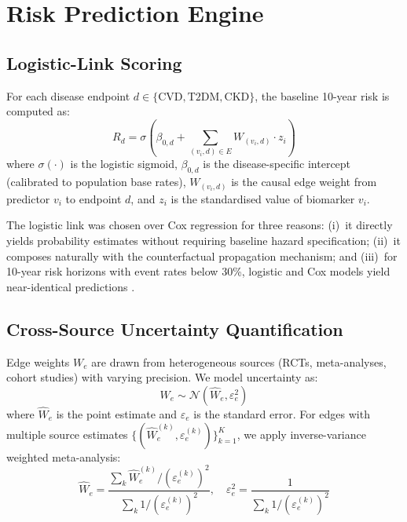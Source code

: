 \documentclass[runningheads]{llncs}
\begin{document}
\section{Risk Prediction Engine}\label{sec:risk}

\subsection{Logistic-Link Scoring}\label{sec:logistic}

For each disease endpoint $d \in \{\text{CVD}, \text{T2DM}, \text{CKD}\}$,
the baseline 10-year risk is computed as:
\begin{equation}\label{eq:risk}
R_d = \sigma\!\left(\beta_{0,d} + \sum_{(v_i, d) \in E} W_{(v_i,d)} \cdot z_i\right)
\end{equation}
where $\sigma(\cdot)$ is the logistic sigmoid, $\beta_{0,d}$ is the
disease-specific intercept (calibrated to population base rates),
$W_{(v_i,d)}$ is the causal edge weight from predictor $v_i$ to
endpoint $d$, and $z_i$ is the standardised value of biomarker $v_i$.

The logistic link was chosen over Cox regression for three reasons:
(i)~it directly yields probability estimates without requiring
baseline hazard specification; (ii)~it composes naturally with the
counterfactual propagation mechanism; and (iii)~for 10-year risk
horizons with event rates below 30\%, logistic and Cox models yield
near-identical predictions \cite{dagostino2008framingham}.

\subsection{Cross-Source Uncertainty Quantification}\label{sec:uncert}

Edge weights $W_e$ are drawn from heterogeneous sources (RCTs,
meta-analyses, cohort studies) with varying precision.  We model
uncertainty as:
\begin{equation}\label{eq:uncert}
W_e \sim \mathcal{N}(\hat{W}_e, \varepsilon_e^2)
\end{equation}
where $\hat{W}_e$ is the point estimate and $\varepsilon_e$ is the
standard error.  For edges with multiple source estimates
$\{(\hat{W}_e^{(k)}, \varepsilon_e^{(k)})\}_{k=1}^K$, we apply
inverse-variance weighted meta-analysis:
\begin{equation}\label{eq:meta}
\hat{W}_e = \frac{\sum_k \hat{W}_e^{(k)} / (\varepsilon_e^{(k)})^2}
{\sum_k 1 / (\varepsilon_e^{(k)})^2}, \quad
\varepsilon_e^2 = \frac{1}{\sum_k 1 / (\varepsilon_e^{(k)})^2}
\end{equation}
\end{document}
